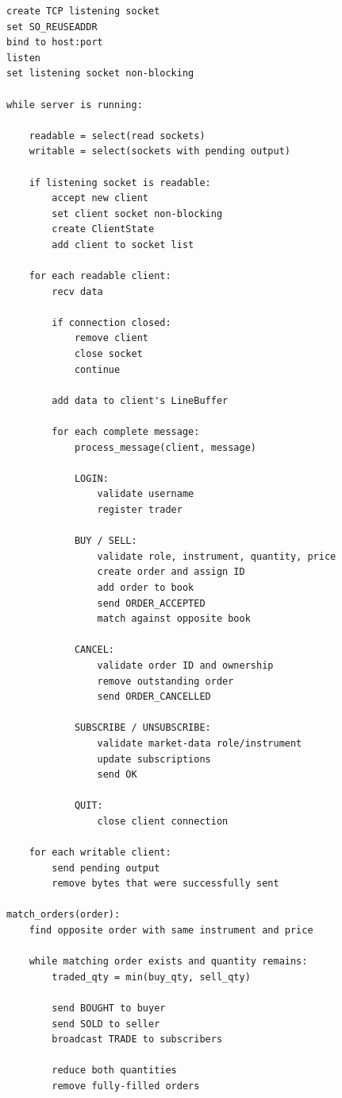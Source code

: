 \documentclass[11pt,a4paper]{article}
\begin{document}
\begin{lstlisting}[style=pseudocode]
create TCP listening socket
set SO_REUSEADDR
bind to host:port
listen
set listening socket non-blocking

while server is running:

    readable = select(read sockets)
    writable = select(sockets with pending output)

    if listening socket is readable:
        accept new client
        set client socket non-blocking
        create ClientState
        add client to socket list

    for each readable client:
        recv data

        if connection closed:
            remove client
            close socket
            continue

        add data to client's LineBuffer

        for each complete message:
            process_message(client, message)

            LOGIN:
                validate username
                register trader

            BUY / SELL:
                validate role, instrument, quantity, price
                create order and assign ID
                add order to book
                send ORDER_ACCEPTED
                match against opposite book

            CANCEL:
                validate order ID and ownership
                remove outstanding order
                send ORDER_CANCELLED

            SUBSCRIBE / UNSUBSCRIBE:
                validate market-data role/instrument
                update subscriptions
                send OK

            QUIT:
                close client connection

    for each writable client:
        send pending output
        remove bytes that were successfully sent

match_orders(order):
    find opposite order with same instrument and price

    while matching order exists and quantity remains:
        traded_qty = min(buy_qty, sell_qty)

        send BOUGHT to buyer
        send SOLD to seller
        broadcast TRADE to subscribers

        reduce both quantities
        remove fully-filled orders
\end{lstlisting}
\end{document}
